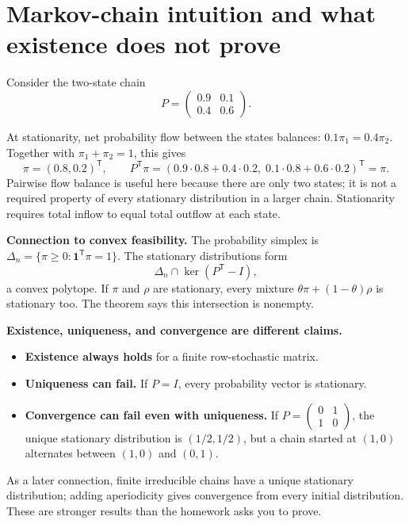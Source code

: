 \documentclass[11pt]{article}
\newcommand{\T}{^{\mathsf T}}
\newcommand{\ones}{\mathbf 1}
\begin{document}
\newpage
\section{Markov-chain intuition and what existence does not prove}
Consider the two-state chain
\[
P=\begin{pmatrix}0.9&0.1\\0.4&0.6\end{pmatrix}.
\]
\begin{center}
\end{center}
At stationarity, net probability flow between the states balances:
$0.1\pi_1=0.4\pi_2$. Together with $\pi_1+\pi_2=1$, this gives
\[
\pi=(0.8,0.2)\T,\qquad
P\T\pi=(0.9\cdot0.8+0.4\cdot0.2,\;
0.1\cdot0.8+0.6\cdot0.2)\T=\pi.
\]
Pairwise flow balance is useful here because there are only two states;
it is not a required property of every stationary distribution in a
larger chain. Stationarity requires total inflow to equal total outflow
at each state.

\textbf{Connection to convex feasibility.} The probability simplex is
$\Delta_n=\{\pi\ge0:\ones\T\pi=1\}$.
The stationary distributions form
\[
\Delta_n\cap\ker(P\T-I),
\]
a convex polytope. If $\pi$ and $\rho$ are stationary, every mixture
$\theta\pi+(1-\theta)\rho$ is stationary too. The theorem says this
intersection is nonempty.

\textbf{Existence, uniqueness, and convergence are different claims.}
\begin{itemize}
\item \textbf{Existence always holds} for a finite row-stochastic matrix.
\item \textbf{Uniqueness can fail.} If $P=I$, every probability vector is stationary.
\item \textbf{Convergence can fail even with uniqueness.} If
$P=\left(\begin{smallmatrix}0&1\\1&0\end{smallmatrix}\right)$,
the unique stationary distribution is $(1/2,1/2)$, but a chain started
at $(1,0)$ alternates between $(1,0)$ and $(0,1)$.
\end{itemize}
As a later connection, finite irreducible chains have a unique stationary
distribution; adding aperiodicity gives convergence from every initial
distribution. These are stronger results than the homework asks you to prove.
\end{document}

